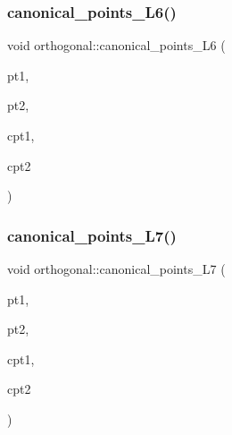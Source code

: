 \subsubsection{\texorpdfstring{canonical\+\_\+points\+\_\+\+L6()}{canonical\_points\_L6()}}
{\footnotesize\ttfamily void orthogonal\+::canonical\+\_\+points\+\_\+\+L6 (\begin{DoxyParamCaption}\item[{\mbox{\hyperlink{galois_8h_a09fddde158a3a20bd2dcadb609de11dc}{I\+NT}}}]{pt1,  }\item[{\mbox{\hyperlink{galois_8h_a09fddde158a3a20bd2dcadb609de11dc}{I\+NT}}}]{pt2,  }\item[{\mbox{\hyperlink{galois_8h_a09fddde158a3a20bd2dcadb609de11dc}{I\+NT}} \&}]{cpt1,  }\item[{\mbox{\hyperlink{galois_8h_a09fddde158a3a20bd2dcadb609de11dc}{I\+NT}} \&}]{cpt2 }\end{DoxyParamCaption})}

\mbox{\label{classorthogonal_a38d3c022b07a3c444e64666b24b3309e}} 
\subsubsection{\texorpdfstring{canonical\+\_\+points\+\_\+\+L7()}{canonical\_points\_L7()}}
{\footnotesize\ttfamily void orthogonal\+::canonical\+\_\+points\+\_\+\+L7 (\begin{DoxyParamCaption}\item[{\mbox{\hyperlink{galois_8h_a09fddde158a3a20bd2dcadb609de11dc}{I\+NT}}}]{pt1,  }\item[{\mbox{\hyperlink{galois_8h_a09fddde158a3a20bd2dcadb609de11dc}{I\+NT}}}]{pt2,  }\item[{\mbox{\hyperlink{galois_8h_a09fddde158a3a20bd2dcadb609de11dc}{I\+NT}} \&}]{cpt1,  }\item[{\mbox{\hyperlink{galois_8h_a09fddde158a3a20bd2dcadb609de11dc}{I\+NT}} \&}]{cpt2 }\end{DoxyParamCaption})}

\mbox{\label{classorthogonal_a561d7c5426dcdb221a961ab2f0d89ae4}} 
